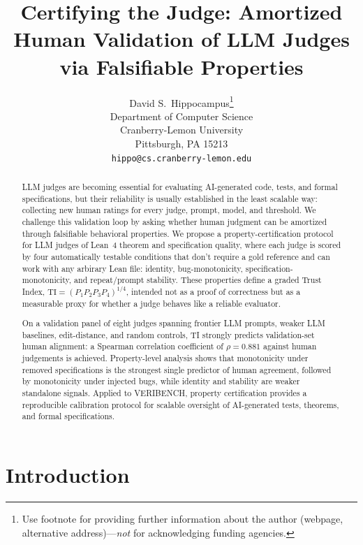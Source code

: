 \documentclass{article}
\title{Certifying the Judge: Amortized Human Validation of LLM Judges via Falsifiable Properties}
\author{%
  David S.~Hippocampus\thanks{Use footnote for providing further information
    about the author (webpage, alternative address)---\emph{not} for acknowledging
    funding agencies.} \\
  Department of Computer Science\\
  Cranberry-Lemon University\\
  Pittsburgh, PA 15213 \\
  \texttt{hippo@cs.cranberry-lemon.edu} \\
}
\begin{document}
\maketitle

\begin{abstract}
  LLM judges are becoming essential for evaluating AI-generated code, tests, and formal specifications, but their reliability is usually established in the least scalable way: collecting new human ratings for every judge, prompt, model, and threshold. We challenge this validation loop by asking whether human judgment can be amortized through falsifiable behavioral properties. We propose a property-certification protocol for LLM judges of Lean~4 theorem and specification quality, where each judge is scored by four automatically testable conditions that don't require a gold reference and can work with any arbirary Lean file: identity, bug-monotonicity, specification-monotonicity, and repeat/prompt stability. These properties define a graded Trust Index, $\mathrm{TI}=(P_1P_2P_3P_4)^{1/4}$, intended not as a proof of correctness but as a measurable proxy for whether a judge behaves like a reliable evaluator.

  On a validation panel of eight judges spanning frontier LLM prompts, weaker LLM baselines, edit-distance, and random controls, TI strongly predicts validation-set human alignment: a Spearman correlation coefficient of $\rho=0.881$ against human judgements is achieved. Property-level analysis shows that monotonicity under removed specifications is the strongest single predictor of human agreement, followed by monotonicity under injected bugs, while identity and stability are weaker standalone signals. Applied to VERIBENCH, property certification provides a reproducible calibration protocol for scalable oversight of AI-generated tests, theorems, and formal specifications.
\end{abstract}

\section{Introduction}
\end{document}
